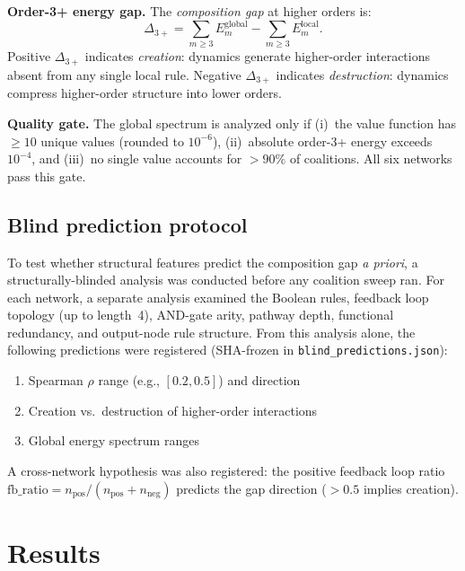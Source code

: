 \documentclass[11pt]{article}
\begin{document}
\textbf{Order-3+ energy gap.}
The \emph{composition gap} at higher orders is:
%
\begin{equation}
\Delta_{3+} = \sum_{m \geq 3} E_m^{\mathrm{global}}
- \sum_{m \geq 3} E_m^{\mathrm{local}}.
\end{equation}
%
Positive $\Delta_{3+}$ indicates \emph{creation}: dynamics generate
higher-order interactions absent from any single local rule. Negative
$\Delta_{3+}$ indicates \emph{destruction}: dynamics compress
higher-order structure into lower orders.

\textbf{Quality gate.}
The global spectrum is analyzed only if (i)~the value function has
$\geq 10$ unique values (rounded to $10^{-6}$), (ii)~absolute
order-3+ energy exceeds $10^{-4}$, and (iii)~no single value accounts
for $> 90\%$ of coalitions. All six networks pass this gate.


\subsection{Blind prediction protocol}
\label{sec:blind}

To test whether structural features predict the composition gap
\emph{a priori}, a structurally-blinded analysis was conducted before
any coalition sweep ran. For each network, a separate analysis
examined the Boolean rules, feedback loop topology (up to length~4),
AND-gate arity, pathway depth, functional redundancy, and output-node
rule structure. From this analysis alone, the following predictions
were registered (SHA-frozen in \texttt{blind\_predictions.json}):
%
\begin{enumerate}
\item Spearman $\rho$ range (e.g., $[0.2, 0.5]$) and direction
\item Creation vs.\ destruction of higher-order interactions
\item Global energy spectrum ranges
\end{enumerate}
%
A cross-network hypothesis was also registered: the positive feedback
loop ratio
$\mathrm{fb\_ratio} = n_{\mathrm{pos}} / (n_{\mathrm{pos}} +
n_{\mathrm{neg}})$ predicts the gap direction ($> 0.5$ implies
creation).


\section{Results}
\label{sec:results}
\end{document}
